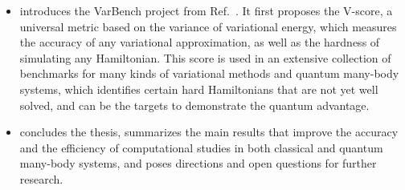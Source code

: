 \begin{itemize}
\item {} introduces the VarBench project from Ref.~\cite{wu2023variational}. It first proposes the V-score, a universal metric based on the variance of variational energy, which measures the accuracy of any variational approximation, as well as the hardness of simulating any Hamiltonian. This score is used in an extensive collection of benchmarks for many kinds of variational methods and quantum many-body systems, which identifies certain hard Hamiltonians that are not yet well solved, and can be the targets to demonstrate the quantum advantage.
\item {} concludes the thesis, summarizes the main results that improve the accuracy and the efficiency of computational studies in both classical and quantum many-body systems, and poses directions and open questions for further research.
\end{itemize}
